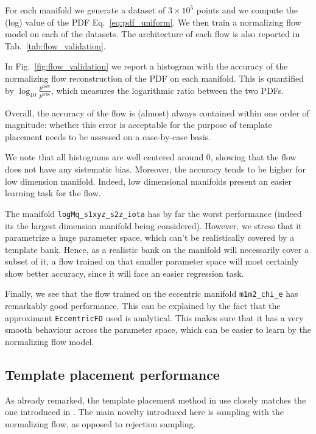 \documentclass[twocolumn,showpacs,preprintnumbers,nofootinbib,prd,
superscriptaddress,10pt]{revtex4-2}
\begin{document}
For each manifold we generate a dataset of $3\times 10^5$ points and we compute the (log) value of the PDF Eq.~\eqref{eq:pdf_uniform}. We then train a normalizing flow model on each of the datasets.
The architecture of each flow is also reported in Tab.~\ref{tab:flow_validation}.

In Fig.~\ref{fig:flow_validation} we report a histogram with the accuracy of the normalizing flow reconstruction of the PDF on each manifold. This is quantified by $\log_{10}\frac{p^\mathrm{flow}}{p^\mathrm{true}}$, which measures the logarithmic ratio between the two PDFs.

Overall, the accuracy of the flow is (almost) always contained within one order of magnitude: whether this error is acceptable for the purpose of template placement needs to be assessed on a case-by-case basis.

We note that all histograms are well centered around $0$, showing that the flow does not have any sistematic bias. Moreover, the accuracy tends to be higher for low dimension manifold. Indeed, low dimensional manifolds present an easier learning task for the flow.

The manifold \texttt{logMq\_s1xyz\_s2z\_iota} has by far the worst performance (indeed its the largest dimension manifold being considered). However, we stress that it parametrize a huge parameter space, which can't be realistically covered by a template bank. Hence, as a realistic bank on the manifold will necessarily cover a subset of it, a flow trained on that smaller parameter space will most certainly show better accuracy, since it will face an easier regression task.

Finally, we see that the flow trained on the eccentric manifold \texttt{m1m2\_chi\_e} has remarkably good performance. This can be explained by the fact that the approximant \texttt{EccentricFD} \cite{lalsuite} used is analytical. This makes sure that it has a very smooth behaviour across the parameter space, which can be easier to learn by the normalizing flow model.


\subsection{Template placement performance} \label{sec:template_placement}

As already remarked, the template placement method in use closely matches the one introduced in \cite{Coogan:2022qxs}.
The main novelty introduced here is sampling with the normalizing flow, as opposed to rejection sampling.
\end{document}
